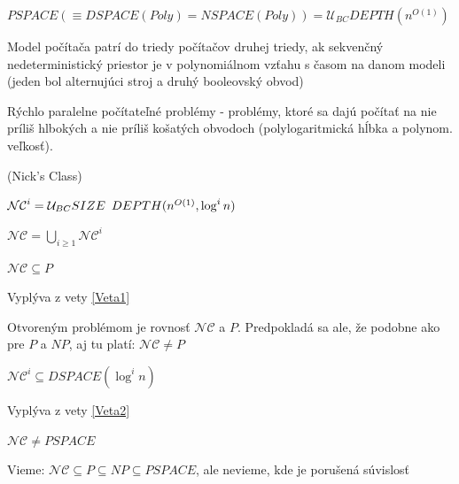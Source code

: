 \begin{dosledok}
  $PSPACE(\equiv DSPACE(Poly)=NSPACE(Poly))=\mathcal{U}_{BC}DEPTH(n^{O(1)})$
\end{dosledok}

\begin{definicia}
  Model počítača patrí do triedy počítačov druhej triedy, ak sekvenčný nedeterministický
  priestor je v polynomiálnom vzťahu s časom na danom modeli (jeden bol alternujúci stroj a
  druhý booleovský obvod)
\end{definicia}

Rýchlo paralelne počítateľné problémy - problémy, ktoré sa dajú počítať na nie príliš
hlbokých a nie príliš košatých obvodoch (polylogaritmická hĺbka a polynom. veľkosť).

\begin{definicia}
  (Nick's Class)
  \begin{description}
    \item $\mathcal{NC}^i = \mathcal{U}_{BC}SIZE \enspace DEPTH(n^{O(1)},\log^in)$
    \item $\mathcal{NC} = \underset{i\geq 1}\bigcup \mathcal{NC}^i$
  \end{description}
\end{definicia}

\begin{veta}
  $\mathcal{NC} \subseteq P $
\end{veta}

\begin{dokaz}
  Vyplýva z vety \ref{Veta1}
\end{dokaz}

Otvoreným problémom je rovnosť $\mathcal{NC}$ a $P$. Predpokladá sa ale, že podobne ako
pre $P$ a $NP$, aj tu platí: $\mathcal{NC}\neq P$

\begin{veta}
  $\mathcal{NC}^i \subseteq DSPACE(\log^in)$
\end{veta}

\begin{dokaz}
  Vyplýva z vety \ref{Veta2}
\end{dokaz}

\begin{dosledok}
  $\mathcal{NC} \neq PSPACE$
\end{dosledok}

\begin{poznamka}
  Vieme: $\mathcal{NC} \subseteq P \subseteq NP \subseteq PSPACE$, ale nevieme, kde je
  porušená súvislosť
\end{poznamka}

